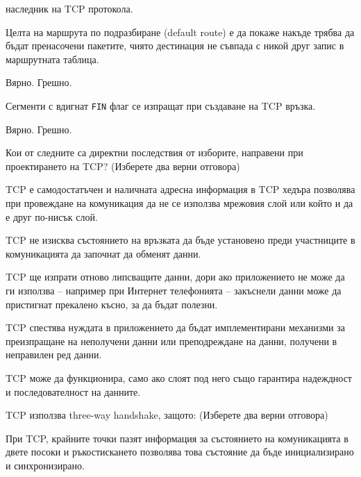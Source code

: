\begin{questions}
\begin{choices}
    \choice наследник на TCP протокола.
  \end{choices}

  \question[6] Целта на маршрута по подразбиране
  (\foreignlanguage{english}{default route}) е да покаже накъде трябва да бъдат
  пренасочени пакетите, чиято дестинация не съвпада с никой друг запис в
  маршрутната таблица.
  \begin{oneparchoices}
    \CorrectChoice Вярно.
    \choice Грешно.
  \end{oneparchoices}

  \question[6] Сегменти с вдигнат \texttt{FIN} флаг се изпращат при създаване на
  TCP връзка.
  \begin{oneparchoices}
    \choice Вярно.
    \CorrectChoice Грешно.
  \end{oneparchoices}

  \question[6] Кои от следните са директни последствия от изборите, направени
  при проектирането на TCP? (Изберете два верни отговора)
  \begin{choices}
    \choice TCP е самодостатъчен и наличната адресна информация в TCP хедъра
    позволява при провеждане на комуникация да не се използва мрежовия слой или
    който и да е друг по-нисък слой.

    \choice TCP не изисква състоянието на връзката да бъде установено преди
    участниците в комуникацията да започнат да обменят данни.

    \CorrectChoice TCP ще изпрати отново липсващите данни, дори ако приложението
    не може да ги използва -- например при Интернет телефонията -- закъснели
    данни може да пристигнат прекалено късно, за да бъдат полезни.

    \CorrectChoice TCP спестява нуждата в приложението да бъдат имплементирани
    механизми за преизпращане на неполучени данни или преподреждане на данни,
    получени в неправилен ред данни.

    \choice TCP може да функционира, само ако слоят под него също гарантира
    надеждност и последователност на данните.
  \end{choices}

  \question[6] TCP използва three-way handshake, защото: (Изберете два верни
  отговора)

  \begin{choices}

    \CorrectChoice При TCP, крайните точки пазят информация за състоянието на
    комуникацията в двете посоки и ръкостискането позволява това състояние да
    бъде инициализирано и синхронизирано.


\end{choices}
\end{questions}
